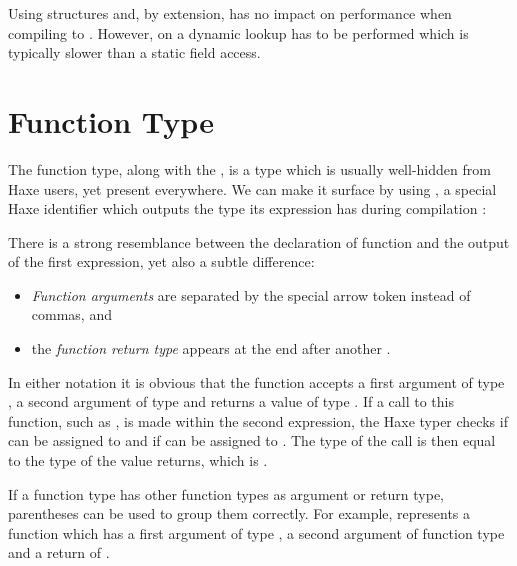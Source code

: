 Using structures and, by extension,  has no impact on performance when compiling to . However, on  a dynamic lookup has to be performed which is typically slower than a static field access.



\section{Function Type}
\label{types-function}


The function type, along with the , is a type which is usually well-hidden from Haxe users, yet present everywhere. We can make it surface by using , a special Haxe identifier which outputs the type its expression has during compilation :


There is a strong resemblance between the declaration of function  and the output of the first  expression, yet also a subtle difference:

\begin{itemize}
	\item \emph{Function arguments} are separated by the special arrow token \expr{->} instead of commas, and
	\item the \emph{function return type} appears at the end after another \expr{->}.
\end{itemize}

In either notation it is obvious that the function  accepts a first argument of type , a second argument of type  and returns a value of type . If a call to this function, such as , is made within the second  expression, the Haxe typer checks if  can be assigned to  and if  can be assigned to . The type of the call is then equal to the type of the value  returns, which is .

If a function type has other function types as argument or return type, parentheses can be used to group them correctly. For example,  represents a function which has a first argument of type , a second argument of function type  and a return of .



